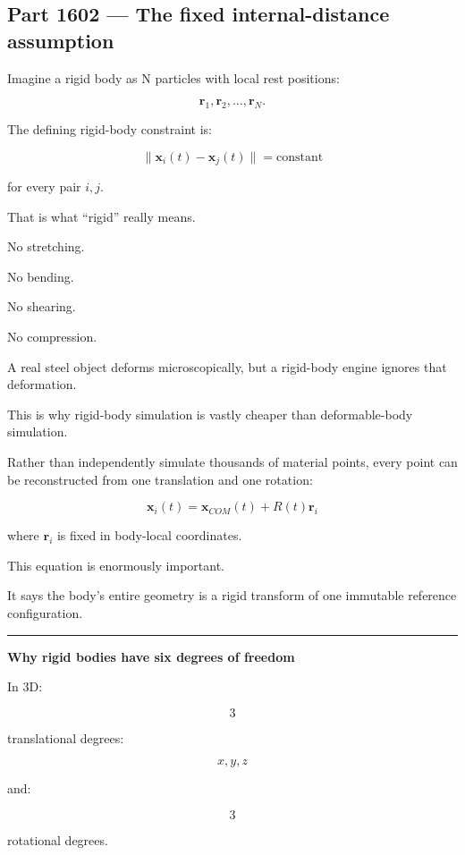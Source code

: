 \subsection{Part 1602 --- The fixed internal-distance assumption}\label{06-engine-ii-ch034-part-1602-the-fixed-internal-distance-assumption}

Imagine a rigid body as N particles with local rest positions:

\[
\mathbf{r}_1,\mathbf{r}_2,\dots,\mathbf{r}_N.
\]

The defining rigid-body constraint is:

\[
\boxed{
\|\mathbf{x}_i(t)-\mathbf{x}_j(t)\|
=
\text{constant}
}
\]

for every pair \(i,j\).

That is what ``rigid'' really means.

No stretching.

No bending.

No shearing.

No compression.

A real steel object deforms microscopically, but a rigid-body engine ignores that deformation.

This is why rigid-body simulation is vastly cheaper than deformable-body simulation.

Rather than independently simulate thousands of material points, every point can be reconstructed from one translation and one rotation:

\[
\boxed{
\mathbf{x}_i(t)
=
\mathbf{x}_{COM}(t)
+
R(t)\mathbf{r}_i
}
\]

where \(\mathbf{r}_i\) is fixed in body-local coordinates.

This equation is enormously important.

It says the body's entire geometry is a rigid transform of one immutable reference configuration.

\begin{center}\rule{0.5\linewidth}{0.5pt}\end{center}

\textbf{Why rigid bodies have six degrees of freedom}

In 3D:

\[
3
\]

translational degrees:

\[
x,y,z
\]

and:

\[
3
\]

rotational degrees.

